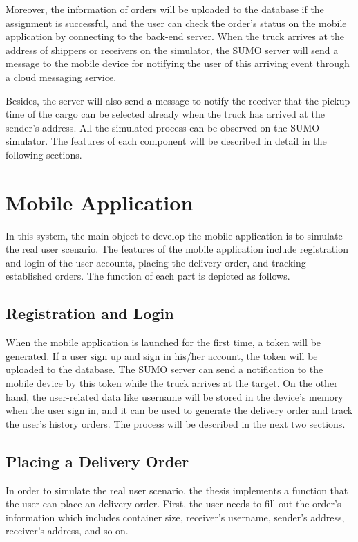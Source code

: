 \documentclass[12pt]{ksthesis}
\begin{document}
\begin{thesis}
{Moreover, the information of orders will be uploaded to the database if the assignment is successful, and the user can check the order’s status on the mobile application by connecting to the back-end server. When the truck arrives at the address of shippers or receivers on the simulator, the SUMO server will send a message to the mobile device for notifying the user of this arriving event through a cloud messaging service. 

Besides, the server will also send a message to notify the receiver that the pickup time of the cargo can be selected already when the truck has arrived at the sender’s address. All the simulated process can be observed on the SUMO simulator. The features of each component will be described in detail in the following sections.

\section{Mobile Application}
In this system, the main object to develop the mobile application is to simulate the real user scenario. The features of the mobile application include registration and login of the user accounts, placing the delivery order, and tracking established orders. The function of each part is depicted as follows.

\subsection{Registration and Login}
When the mobile application is launched for the first time, a token will be generated. If a user sign up and sign in his/her account, the token will be uploaded to the database. The SUMO server can send a notification to the mobile device by this token while the truck arrives at the target. On the other hand, the user-related data like username will be stored in the device’s memory when the user sign in, and it can be used to generate the delivery order and track the user’s history orders. The process will be described in the next two sections.

\subsection{Placing a Delivery Order}
In order to simulate the real user scenario, the thesis implements a function that the user can place an delivery order. First, the user needs to fill out the order’s information which includes container size, receiver’s username, sender’s address, receiver’s address, and so on. 

}
\end{thesis}
\end{document}
